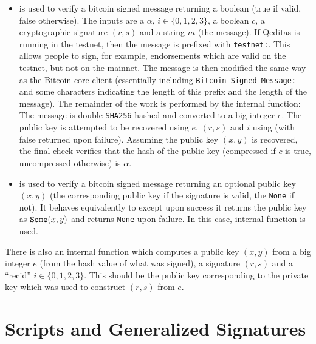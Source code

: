 \begin{itemize}
\item {} is used to verify a bitcoin signed message returning a boolean (true if valid, false otherwise).
The inputs are a {} $\alpha$, $i\in\{0,1,2,3\}$, a boolean $c$, a cryptographic signature $(r,s)$
and a string $m$ (the message).
If Qeditas is running in the testnet, then the message is prefixed with {\tt{testnet:}}.
This allows people to sign, for example, endorsements which are valid on the testnet, but not on the mainnet.
The message is then modified the same way as the Bitcoin core client (essentially
including {\tt{Bitcoin Signed Message:}} and some characters indicating the length of this prefix and the length of the message).
The remainder of the work is performed by the internal {} function:
The message is double {\tt{SHA256}} hashed and converted to a big integer $e$.
The public key is attempted to be recovered
using $e$, $(r,s)$ and $i$ using {} (with false returned upon failure).
Assuming the public key $(x,y)$ is recovered, the final check verifies that the hash of the public key
(compressed if $c$ is true, uncompressed otherwise) is $\alpha$.
\item {} is used to verify a bitcoin signed message returning an optional public key $(x,y)$ (the corresponding public key if the signature is valid, the {\tt{None}} if not).
It behaves equivalently to {}
except upon success it returns the public key as ${\tt{Some}}(x,y)$
and returns {\tt{None}} upon failure.
In this case, internal {} function is used.
\end{itemize}

There is also an internal function {} which
computes a public key $(x,y)$
from a big integer $e$ (from the hash value of what was signed), a signature $(r,s)$ and a ``recid'' $i\in\{0,1,2,3\}$.
This should be the public key corresponding to the private key which was used to construct $(r,s)$
from $e$.

\section{Scripts and Generalized Signatures}


